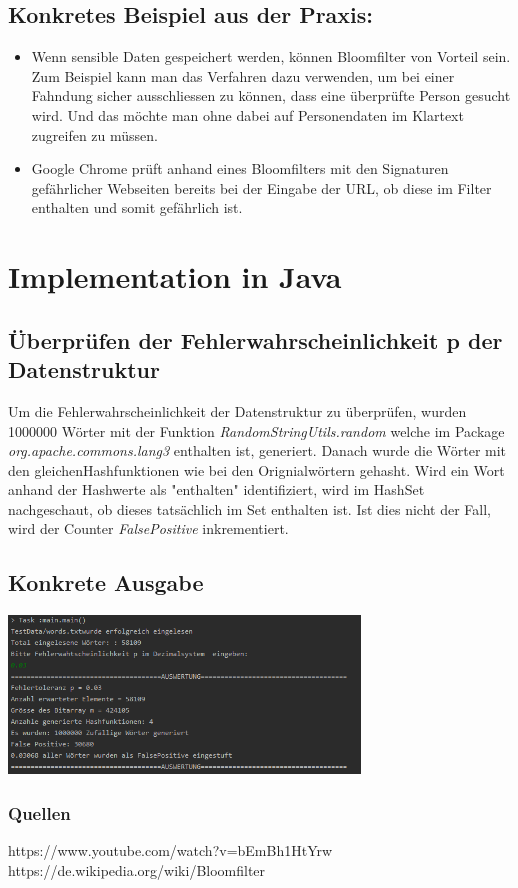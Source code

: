 \documentclass[12 pt]{article}
\begin{document}
\subsection{Konkretes Beispiel aus der Praxis: }
\begin{itemize}
    \item{Wenn sensible Daten gespeichert werden, können Bloomfilter von Vorteil sein. Zum Beispiel kann man das Verfahren dazu verwenden, um bei einer Fahndung sicher ausschliessen zu können, dass eine überprüfte Person gesucht wird. Und das möchte man ohne dabei auf Personendaten im Klartext zugreifen zu müssen.}
    \item{Google Chrome prüft anhand eines Bloomfilters mit den Signaturen gefährlicher Webseiten bereits bei der Eingabe der URL, ob diese im Filter enthalten und somit gefährlich ist.}
\end{itemize}
\pagebreak
\section{Implementation in Java}
\subsection{Überprüfen der Fehlerwahrscheinlichkeit p der Datenstruktur}
Um die Fehlerwahrscheinlichkeit der Datenstruktur zu überprüfen, wurden 1000000 Wörter mit der Funktion \emph{RandomStringUtils.random} welche im Package \emph{org.apache.commons.lang3} enthalten ist, generiert. Danach wurde die Wörter mit den gleichenHashfunktionen wie bei den Orignialwörtern gehasht. Wird ein Wort anhand der Hashwerte als "enthalten" identifiziert, wird im HashSet nachgeschaut, ob dieses tatsächlich im Set enthalten ist. Ist dies nicht der Fall, wird der Counter \emph{FalsePositive} inkrementiert.
\subsection{Konkrete Ausgabe}
\includegraphics[width=0.7\textwidth]{Ausgabe_Java.png}
\subsubsection{Quellen}
https://www.youtube.com/watch?v=bEmBh1HtYrw
\linebreak https://de.wikipedia.org/wiki/Bloomfilter
\end{document}
